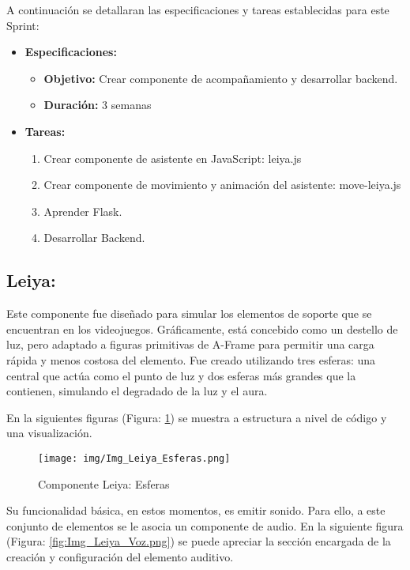 \documentclass[a4paper, 12pt]{book}
\begin{document}
    A continuación se detallaran las especificaciones y tareas establecidas para este Sprint:
    \begin{itemize}
        \item \textbf{Especificaciones:}
        \begin{itemize}
            \item \textbf{Objetivo:} Crear componente de acompañamiento y desarrollar backend. 
            \item \textbf{Duración:} 3 semanas

        \end{itemize}
        
        \item \textbf{Tareas:}
        \begin{enumerate}
            \item Crear componente de asistente en JavaScript: leiya.js  
            \item Crear componente de movimiento y animación del asistente: move-leiya.js
            \item Aprender Flask.
            \item Desarrollar Backend.
        \end{enumerate}
    \end{itemize}
        \subsection{Leiya:} 

        Este componente fue diseñado para simular los elementos de soporte que se encuentran en los videojuegos. Gráficamente, está concebido como un destello de luz, pero adaptado a figuras primitivas de A-Frame para permitir una carga rápida y menos costosa del elemento. Fue creado utilizando tres esferas: una central que actúa como el punto de luz y dos esferas más grandes que la contienen, simulando el degradado de la luz y el aura.

        En la siguientes figuras (Figura: \ref{fig:Img_Leiya_Esferas}) se muestra a estructura a nivel de código y una visualización.
            \begin{figure}[H]
                \centering
                \texttt{[image: img/Img\_Leiya\_Esferas.png]}
                \caption{Componente Leiya: Esferas}
                \label{fig:Img_Leiya_Esferas}
            \end{figure}

        Su funcionalidad básica, en estos momentos, es emitir sonido. Para ello, a este conjunto de elementos se le asocia un componente de audio. En la siguiente figura (Figura: \ref{fig:Img_Leiya_Voz.png}) se puede apreciar la sección encargada de la creación y configuración del elemento auditivo.
\end{document}
